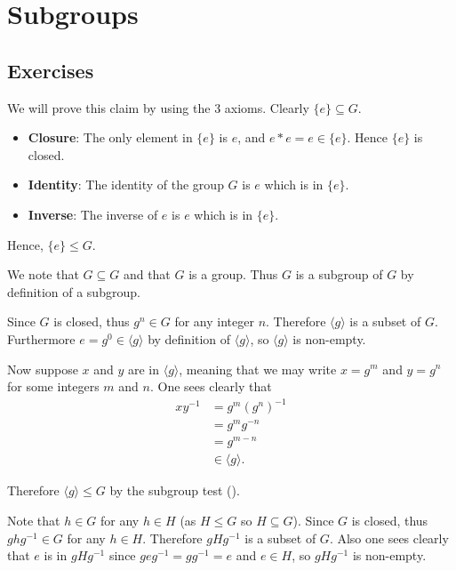 \section{Subgroups}
\subsection*{Exercises}
\begin{questions}
    \item \begin{partquestions}{\alph*}
        \item We will prove this claim by using the 3 axioms. Clearly $\{e\} \subseteq G$.
        \begin{itemize}
            \item \textbf{Closure}: The only element in $\{e\}$ is $e$, and $e \ast e = e \in \{e\}$. Hence $\{e\}$ is closed.
            \item \textbf{Identity}: The identity of the group $G$ is $e$ which is in $\{e\}$.
            \item \textbf{Inverse}: The inverse of $e$ is $e$ which is in $\{e\}$.
        \end{itemize}
        Hence, $\{e\} \leq G$.
        \item We note that $G \subseteq G$ and that $G$ is a group. Thus $G$ is a subgroup of $G$ by definition of a subgroup.
    \end{partquestions}

    \item Since $G$ is closed, thus $g^n \in G$ for any integer $n$. Therefore $\langle g \rangle$ is a subset of $G$. Furthermore $e = g^0 \in \langle g\rangle$ by definition of $\langle g\rangle$, so $\langle g \rangle$ is non-empty.

    Now suppose $x$ and $y$ are in $\langle g \rangle$, meaning that we may write $x = g^m$ and $y = g^n$ for some integers $m$ and $n$. One sees clearly that
    \begin{align*}
        xy^{-1} &= g^m\left(g^n\right)^{-1}\\
        &= g^mg^{-n}\\
        &= g^{m-n}\\
        &\in \langle g\rangle.
    \end{align*}

    Therefore $\langle g \rangle \leq G$ by the subgroup test ().

    \item Note that $h \in G$ for any $h \in H$ (as $H \leq G$ so $H \subseteq G$). Since $G$ is closed, thus $ghg^{-1} \in G$ for any $h \in H$. Therefore $gHg^{-1}$ is a subset of $G$. Also one sees clearly that $e$ is in $gHg^{-1}$ since $geg^{-1} = gg^{-1} = e$ and $e \in H$, so $gHg^{-1}$ is non-empty.


\end{questions}
